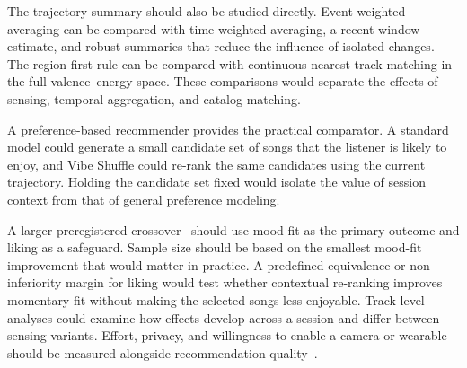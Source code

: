 The trajectory summary should also be studied directly. Event-weighted
averaging can be compared with time-weighted averaging, a recent-window
estimate, and robust summaries that reduce the influence of isolated changes.
The region-first rule can be compared with continuous nearest-track matching in
the full valence--energy space. These comparisons would separate the effects of
sensing, temporal aggregation, and catalog matching.

A preference-based recommender provides the practical comparator. A standard
model could generate a small candidate set of songs that the listener is likely
to enjoy, and Vibe Shuffle could re-rank the same candidates using the current
trajectory. Holding the candidate set fixed would isolate the value of session
context from that of general preference modeling.

A larger preregistered crossover~\cite{nosek2018,lakens2022} should use mood
fit as the primary outcome and liking as a safeguard. Sample size should be
based on the smallest mood-fit improvement that would matter in practice. A
predefined equivalence or non-inferiority margin for liking would test whether
contextual re-ranking improves momentary fit without making the selected songs
less enjoyable. Track-level analyses could examine how effects develop across
a session and differ between sensing variants. Effort, privacy, and willingness
to enable a camera or wearable should be measured alongside recommendation
quality~\cite{knijnenburg2012}.
